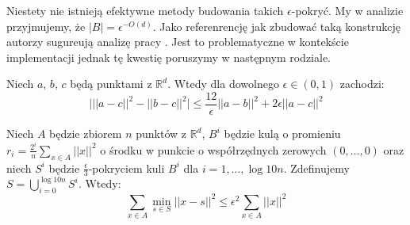 \noindent
Niestety nie istnieją efektywne metody budowania takich $\epsilon$-pokryć.
My w analizie przyjmujemy, że  $|B| = \epsilon^{-O(d)}$.
Jako referenrencję jak zbudować taką konstrukcję autorzy \cite{DBLP:journals/ki/MunteanuS18} sugureują analizę pracy \cite{chazelle_2000}.
Jest to problematyczne w kontekście implementacji jednak tę kwestię poruszymy w następnym rodziale.
\begin{lemma}{\cite{DBLP:journals/ki/MunteanuS18}}
    Niech $a$, $b$, $c$ będą punktami z $\mathbb{R}^{d}$.
    Wtedy dla dowolnego $\epsilon \in (0,1)$ zachodzi:
    \begin{equation}
        \Big| ||a-c||^{2} - ||b-c||^{2} \Big| \leq \frac{12}{\epsilon} ||a-b||^2 + 2\epsilon||a-c||^2
    \end{equation}
\end{lemma}
\begin{lemma}
    Niech $A$ będzie zbiorem $n$ punktów z $\mathbb{R}^d$, $B^{i}$ będzie kulą o promieniu $r_{i} = \frac{2^{i}}{n}\sum_{x \in A} ||x||^{2}$ o środku w punkcie o współrzędnych zerowych $(0, \dots, 0)$ oraz niech $S^{i}$ będzie $\frac{\epsilon}{3}$-pokryciem kuli $B^{i}$ dla $i = 1, \dots, \log10n$.
    Zdefinujemy $S = \bigcup_{i=0}^{\log 10n} S^{i}$. 
    Wtedy:
    \begin{equation}
        \sum_{x\in A} \min_{s \in S} ||x - s||^{2} \leq \epsilon^{2} \sum_{x \in A} ||x||^{2}
    \end{equation}
\end{lemma}

